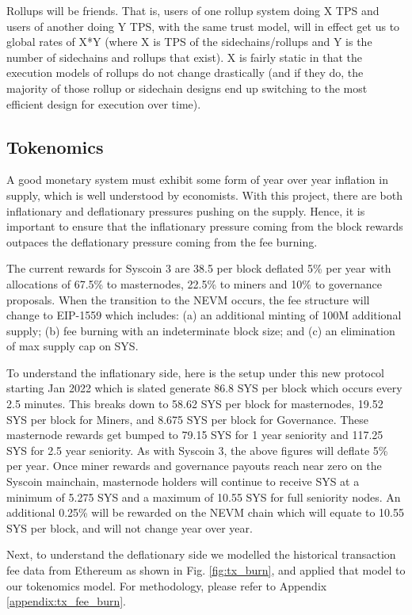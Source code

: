 \documentclass[peerreview]{ieeesyscoin}
\begin{document}
Rollups will be friends. That is, users of one rollup system doing X TPS and users of another doing Y TPS, with the same trust model, will in effect get us to global rates of X*Y (where X is TPS of the sidechains/rollups and Y is the number of sidechains and rollups that exist). X is fairly static in that the execution models of rollups do not change drastically (and if they do, the majority of those rollup or sidechain designs end up switching to the most efficient design for execution over time).

\subsection{Tokenomics}

A good monetary system must exhibit some form of year over year inflation in supply, which is well understood by economists. With this project, there are both inflationary and deflationary pressures pushing on the supply. Hence, it is important to ensure that the inflationary pressure coming from the block rewards outpaces the deflationary pressure coming from the fee burning. 

The current rewards for Syscoin 3 are 38.5 per block deflated 5\% per year with allocations of 67.5\% to masternodes, 22.5\% to miners and 10\% to governance proposals. When the transition to the NEVM occurs, the fee structure will change to EIP-1559 which includes: (a) an additional minting of 100M additional supply; (b) fee burning with an indeterminate block size; and (c) an elimination of max supply cap on SYS.

To understand the inflationary side, here is the setup under this new protocol starting Jan 2022 which is slated generate 86.8 SYS per block which occurs every 2.5 minutes. This breaks down to 58.62 SYS per block for masternodes, 19.52 SYS per block for Miners, and 8.675 SYS per block for Governance. These masternode rewards get bumped to 79.15 SYS for 1 year seniority and 117.25 SYS for 2.5 year seniority. As with Syscoin 3, the above figures will deflate 5\% per year. Once miner rewards and governance payouts reach near zero on the Syscoin mainchain, masternode holders will continue to receive SYS at a minimum of 5.275 SYS and a maximum of 10.55 SYS for full seniority nodes. An additional 0.25\% will be rewarded on the NEVM chain which will equate to 10.55 SYS per block, and will not change year over year.

Next, to understand the deflationary side we modelled the historical transaction fee data from Ethereum as shown in Fig. \ref{fig:tx_burn}, and applied that model to our tokenomics model. For methodology, please refer to Appendix \ref{appendix:tx_fee_burn}.
\end{document}
